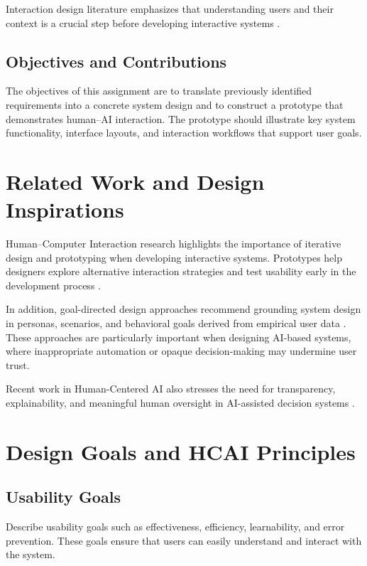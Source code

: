 \documentclass[sigconf]{acmart}
\begin{document}
Interaction design literature emphasizes that understanding users and their context is a crucial step before developing interactive systems \cite{preece2015interaction,sharp2019interaction}.

\subsection{Objectives and Contributions}

The objectives of this assignment are to translate previously identified requirements into a concrete system design and to construct a prototype that demonstrates human--AI interaction. The prototype should illustrate key system functionality, interface layouts, and interaction workflows that support user goals.

\section{Related Work and Design Inspirations}

Human–Computer Interaction research highlights the importance of iterative design and prototyping when developing interactive systems. Prototypes help designers explore alternative interaction strategies and test usability early in the development process \cite{sharp2019interaction}.

In addition, goal-directed design approaches recommend grounding system design in personas, scenarios, and behavioral goals derived from empirical user data \cite{cooper2014aboutface}. These approaches are particularly important when designing AI-based systems, where inappropriate automation or opaque decision-making may undermine user trust.

Recent work in Human-Centered AI also stresses the need for transparency, explainability, and meaningful human oversight in AI-assisted decision systems \cite{amershi2019guidelines}.

\section{Design Goals and HCAI Principles}

\subsection{Usability Goals}

Describe usability goals such as effectiveness, efficiency, learnability, and error prevention. These goals ensure that users can easily understand and interact with the system.
\end{document}

